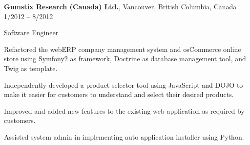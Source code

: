 \documentclass[10pt]{article}
\newcommand{\halfblankline}{\quad\vspace{-0.5\baselineskip}\pagebreak[3]}
\begin{document}
\halfblankline

\textbf{Gumstix Research (Canada) Ltd.}, Vancouver, British Columbia, Canada \hfill 	1/2012 -- 8/2012
\begin{outerlist}
\item[] Software Engineer
\begin{innerlist}
\item Refactored the webERP company management system and osCommerce online store using Symfony2 as framework, Doctrine as database management tool, and Twig as template.
\item Independently developed a product selector tool using JavaScript and DOJO to make it easier for customers to understand and select their desired products.
\item Improved and added new features to the existing web application as required by customers.
\item Assisted system admin in implementing auto application installer using Python.
\end{innerlist}
\end{outerlist}
\end{document}
